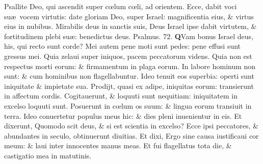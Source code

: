 \documentclass[a5paper,10pt]{book}
\def\ae{æ}
\def\oe{œ}
\begin{document}
\begin{multicols*}{2}
\newline \color{red} P\color{black}sallite Deo, qui ascendit super c\oe lum c\oe li, ad orientem.
\newline \color{red} E\color{black}cce, dabit voci su\ae \ vocem virtutis: date gloriam Deo, super Israel: magnificentia eius, \& virtus eius in nubibus.
\newline \color{red} M\color{black}irabilis deus in sanctis suis, Deus Israel ipse dabit virtutem, \& fortitudinem plebi su\ae : benedictus deus.
\newline \color{red} Psalmus. 72. \color{black}%
\vspace{-.5em}
\lettrine[lines=2]{\bfseries \color{red} Q}{}Vam bonus Israel deus, his, qui recto sunt corde?
\newline \color{red} M\color{black}ei autem pene moti sunt pedes: pene effusi sunt gressus mei.
\newline \color{red} Q\color{black}uia zelaui super iniquos, pacem peccatorum videns.
\newline \color{red} Q\color{black}uia non est respectus morti eorum: \& firmamentum in plaga eorum.
\newline \color{red} I\color{black}n labore hominum non sunt: \& cum hominibus non flagellabuntur.
\newline \color{red} I\color{black}deo tenuit eos superbia: operti sunt iniquitate \& impietate sua.
\newline \color{red} P\color{black}rodijt, quasi ex adipe, iniquitas eorum: transierunt in affectum cordis.
\newline \color{red} C\color{black}ogitauerunt, \& loquuti sunt nequitiam: iniquitatem in excelso loquuti sunt.
\newline \color{red} P\color{black}osuerunt in c\oe lum os suum: \& lingua eorum transiuit in terra.
\newline \color{red} I\color{black}deo conuertetur populus meus hic: \& dies pleni inuenientur in eis.
\newline \color{red} E\color{black}t dixerunt, Quomodo scit deus, \& si est scientia in excelso?
\newline \color{red} E\color{black}cce ipsi peccatores, \& abundantes in seculo, obtinuerunt diuitias.
\newline \color{red} E\color{black}t dixi, Ergo sine causa iustificaui cor meum: \& laui inter innocentes manus meas.
\newline \color{red} E\color{black}t fui flagellatus tota die, \& castigatio mea in matutinis.

\end{multicols*}
\end{document}
